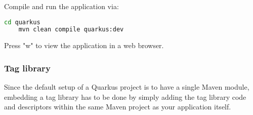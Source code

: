 Compile and run the application via:
\begin{lstlisting}[language=bash]
	cd quarkus
	mvn clean compile quarkus:dev
\end{lstlisting}
Press "w" to view the application in a web browser.

\subsubsection{Tag library}
Since the default setup of a Quarkus project is to have a single Maven module,
embedding a tag library has to be done by simply adding the tag library code and descriptors within the same Maven project as your application itself.


